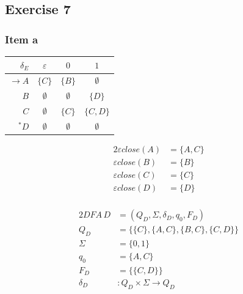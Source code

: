 {\subsection{Exercise 7}
\subsubsection{Item a}
\begin{center}
\begin{minipage}{0.35\textwidth}
\begin{center} \begin{tabular}{r | c c c}
	$\delta_E     $ & $\varepsilon$ & $0        $ & $1        $ \\ \hline
	$\rightarrow A$ & $\{C      \}$ & $\{B    \}$ & $\emptyset$ \\
	$            B$ & $\emptyset  $ & $\emptyset$ & $\{D    \}$ \\
	$            C$ & $\emptyset  $ & $\{C    \}$ & $\{C,D  \}$\\
	$      ^* D$ & $\emptyset  $ & $\emptyset$ & $\emptyset$
\end{tabular} \end{center}
\end{minipage}%
\begin{minipage}{0.25\textwidth}
	\begin{alignat*}{2}
		\varepsilon close(A)&=\{A,C\}\\
		\varepsilon close(B)&=\{B\}\\
		\varepsilon close(C)&=\{C\}\\
		\varepsilon close(D)&=\{D\}\\
	\end{alignat*}
\end{minipage}
\end{center}
\begin{center}
\begin{minipage}[c]{0.44\textwidth}
	\begin{alignat*}{2}
		DFA\,D    &= (Q_D, \Sigma, \delta_D, q_0, F_D)\\
		Q_D      &= \{\{C\},\{A,C\},\{B,C\},\{C,D\}\}\\
		\Sigma   &= \{0,1\}\\
		q_0      &= \{A,C\}\\
		F_D      &= \{\{C,D\}\}\\
		\delta_D &\colon Q_D \times \Sigma \rightarrow Q_D
	\end{alignat*}
\end{minipage}%
\begin{minipage}[c]{0.32\textwidth}

\end{minipage}
\end{center}}
